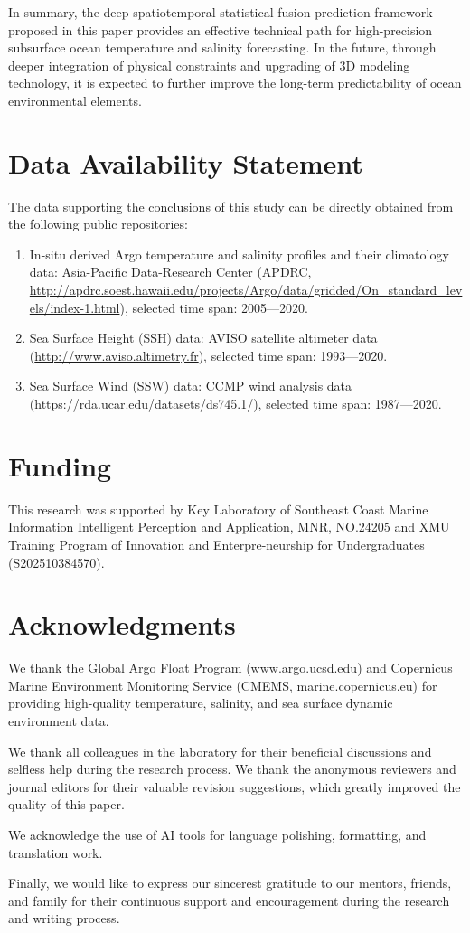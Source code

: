 \documentclass[webpdf,contemporary,large]{oup-authoring-template}
\begin{document}
In summary, the deep spatiotemporal-statistical fusion prediction framework proposed in this paper provides an effective technical path for high-precision subsurface ocean temperature and salinity forecasting. In the future, through deeper integration of physical constraints and upgrading of 3D modeling technology, it is expected to further improve the long-term predictability of ocean environmental elements.

\section*{Data Availability Statement}
The data supporting the conclusions of this study can be directly obtained from the following public repositories:
\begin{enumerate}
    \renewcommand{\labelenumi}{\alph{enumi})}
    \item In-situ derived Argo temperature and salinity profiles and their climatology data: Asia-Pacific Data-Research Center (APDRC, \url{http://apdrc.soest.hawaii.edu/projects/Argo/data/gridded/On_standard_levels/index-1.html}), selected time span: 2005—2020.
    \item Sea Surface Height (SSH) data: AVISO satellite altimeter data (\url{http://www.aviso.altimetry.fr}), selected time span: 1993—2020.
    \item Sea Surface Wind (SSW) data: CCMP wind analysis data (\url{https://rda.ucar.edu/datasets/ds745.1/}), selected time span: 1987—2020.
\end{enumerate}

\section*{Funding}
This research was supported by Key Laboratory of Southeast Coast Marine Information Intelligent Perception and Application, MNR, NO.24205 and XMU Training Program of Innovation and Enterpre-neurship for Undergraduates (S202510384570).

\section*{Acknowledgments}

We thank the Global Argo Float Program (www.argo.ucsd.edu) and Copernicus Marine Environment Monitoring Service (CMEMS, marine.copernicus.eu) for providing high-quality temperature, salinity, and sea surface dynamic environment data.

We thank all colleagues in the laboratory for their beneficial discussions and selfless help during the research process. We thank the anonymous reviewers and journal editors for their valuable revision suggestions, which greatly improved the quality of this paper.

We acknowledge the use of AI tools for language polishing, formatting, and translation work.

Finally, we would like to express our sincerest gratitude to our mentors, friends, and family for their continuous support and encouragement during the research and writing process.



\end{document}
